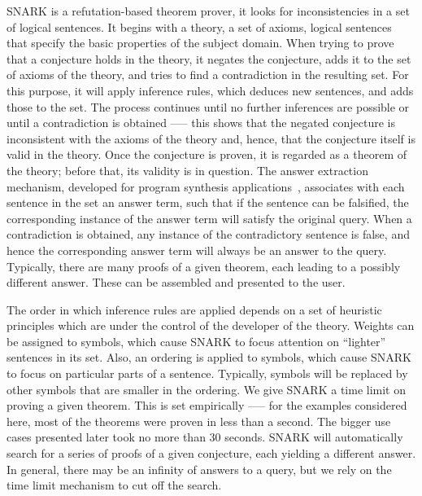 SNARK is a refutation-based theorem prover, \ie it looks for inconsistencies in a set of logical sentences. It begins with a theory, a set of axioms, \ie logical sentences that specify the basic properties of the subject domain. 
When trying to prove that a conjecture holds in the theory, it negates the conjecture, adds it to the set of axioms of the theory, and tries to find a contradiction in the resulting set. 
For this purpose, it will apply inference rules, which deduces new sentences, and adds those to the set. The process continues until no further inferences are possible or until a contradiction is obtained \-—-- this shows that the negated conjecture is inconsistent with the axioms of the theory and, hence, that the conjecture itself is valid in the theory. 
Once the conjecture is proven, it is regarded as a theorem of the theory; before that, its validity is in question.
The answer extraction mechanism, developed for program synthesis applications~\cite{Manna:1980:DAP:357084.357090}, associates with each sentence in the set an answer term, such that if the sentence can be falsified, the corresponding instance of the answer term will satisfy the original query. 
When a contradiction is obtained, any instance of the contradictory sentence is false, and hence the corresponding answer term will always  be an answer to the query. 
Typically, there are many proofs of a given theorem, each leading to a possibly different answer. 
These can be assembled and presented to the user.

The order in which inference rules are applied depends on a set of heuristic principles which are under the control of the developer of the theory. 
Weights can be assigned to symbols, which cause SNARK to focus attention on “lighter” sentences in its set. 
Also, an ordering is applied to symbols, which cause SNARK to focus on particular parts of a sentence. 
Typically, symbols will be replaced by other symbols that are smaller in the ordering. 
We give SNARK a time limit on proving a given theorem. 
This is set empirically \-—-- for the examples considered here, most of the theorems were proven in less than a second. The bigger use cases presented later took no more than 30 seconds.
SNARK will automatically search for a series of proofs of a given conjecture, each yielding a different answer.
In general, there may be an infinity of answers to a query, but we rely on the time limit mechanism to cut off the search.

